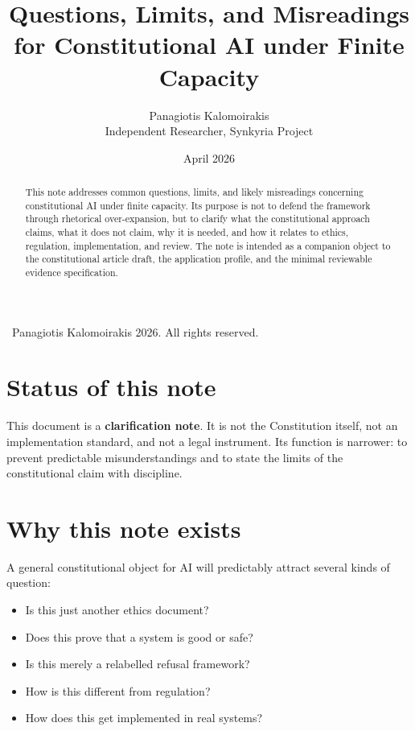 \documentclass[11pt]{article}
\title{Questions, Limits, and Misreadings\\
for Constitutional AI under Finite Capacity}
\author{Panagiotis Kalomoirakis\\
Independent Researcher, Synkyria Project}
\date{April 2026}
\begin{document}
\maketitle

\begin{center}
\small \textcopyright\ Panagiotis Kalomoirakis 2026. All rights reserved.
\end{center}

\begin{abstract}
This note addresses common questions, limits, and likely misreadings concerning constitutional AI under finite capacity. Its purpose is not to defend the framework through rhetorical over-expansion, but to clarify what the constitutional approach claims, what it does not claim, why it is needed, and how it relates to ethics, regulation, implementation, and review. The note is intended as a companion object to the constitutional article draft, the application profile, and the minimal reviewable evidence specification.
\end{abstract}

\section{Status of this note}

This document is a \textbf{clarification note}. It is not the Constitution itself, not an implementation standard, and not a legal instrument. Its function is narrower: to prevent predictable misunderstandings and to state the limits of the constitutional claim with discipline.

\section{Why this note exists}

A general constitutional object for AI will predictably attract several kinds of question:
\begin{itemize}[leftmargin=2em]
    \item Is this just another ethics document?
    \item Does this prove that a system is good or safe?
    \item Is this merely a relabelled refusal framework?
    \item How is this different from regulation?
    \item How does this get implemented in real systems?
\end{itemize}
\end{document}
